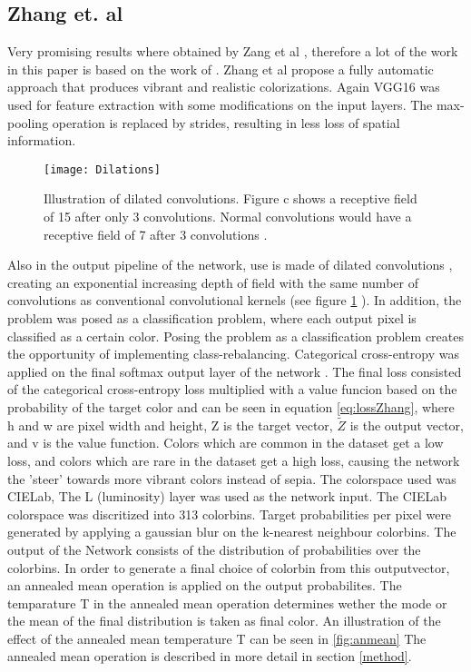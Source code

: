\subsection{Zhang et. al}
Very promising results where obtained by Zang et al \cite{Zhang}, therefore a lot of the work in this paper is based on the work of \cite{Zhang}.
 Zhang et al propose a fully
automatic approach that produces vibrant and realistic colorizations. Again VGG16 was used for feature extraction with some modifications on the input layers. The max-pooling operation is replaced by strides, resulting in less loss of spatial information. 

\begin{figure}[h]
	\centering
		\texttt{[image: Dilations]}
	\caption{Illustration of dilated convolutions. Figure c shows a receptive field of 15 after only 3 convolutions. Normal convolutions would have a receptive field of 7 after 3 convolutions \cite{yu2015multi}.}
	\label{fig:dilations}
\end{figure}

Also in the output pipeline of the network, use is made of dilated convolutions \cite{yu2015multi}, creating an exponential increasing depth of field with the same number of convolutions as conventional convolutional kernels (see figure \ref{fig:dilations} ).
In addition, the problem was posed as a classification problem, where each output pixel is classified as a certain color. Posing the problem as a classification problem creates the opportunity of implementing class-rebalancing. Categorical cross-entropy was applied on the final softmax output layer of the network \cite{de2005tutorial}. The final loss consisted of the categorical cross-entropy loss multiplied with a value funcion based on the probability of the target color and can be seen in equation \ref{eq:lossZhang}, where h and w are pixel width and height, Z is the target vector, $\widetilde{Z}$ is the output vector, and v is the value function.
Colors which are common in the dataset get a low loss, and colors which are rare in the dataset get a high loss, causing the network the 'steer' towards more vibrant colors instead of sepia. The colorspace used was CIELab, The L (luminosity) layer was used as the network input. The CIELab colorspace was discritized into 313 colorbins. Target probabilities per pixel were generated by applying a gaussian blur on the k-nearest neighbour colorbins. The output of the Network consists of the distribution of probabilities over the colorbins. In order to generate a final choice of colorbin from this outputvector, an annealed mean operation is applied on the output probabilites. The temparature T in the annealed mean operation determines wether the mode or the mean of the final distribution is taken as final color. An illustration of the effect of the annealed mean temperature T can be seen in \ref{fig:anmean} The annealed mean operation is described in more detail in section \ref{method}.


